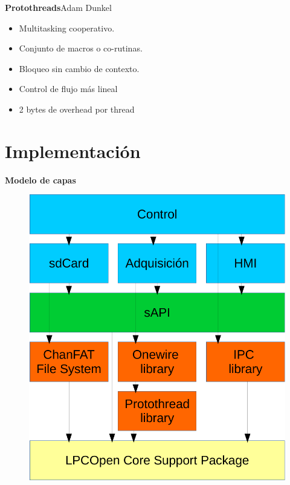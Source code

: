\documentclass[11pt, xcolor={table,xcdraw}]{beamer}
\begin{document}
\begin{frame}{\textbf{\LARGE{Protothreads}}}{Adam Dunkel}
	\vspace{-.3cm}
	\fontsize{18pt}{18}\selectfont
	\vspace{-.7cm}
	\centering
	\begin{itemize}
		\item Multitasking cooperativo.
		\vspace{15px}	
		\item Conjunto de macros o co-rutinas.
		\vspace{15px}
		\item Bloqueo sin cambio de contexto.
		\vspace{15px}
		\item Control de flujo más lineal
		\vspace{15px}
		\item 2 bytes de overhead por thread		
	\end{itemize}
\end{frame}
\section{Implementación}

\begin{frame}{\textbf{\LARGE{Modelo de capas}}}
	\vspace{-.7cm}
	\begin{figure}[H]
		\includegraphics[height=.8\textheight]{./imagenes/capas.pdf}
	\end{figure}	
\end{frame}
\end{document}
